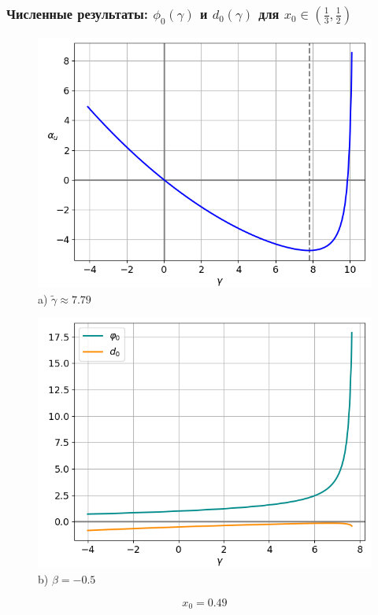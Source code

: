 \documentclass[fullscreen=true, unicode, bookmarks=false]{beamer}
\begin{document}
\begin{frame}
\frametitle{ Численные результаты: $ \phi_0(\gamma) $ и $ d_0(\gamma) $ для $ x_0 \in \left( \frac{1}{3}, \frac{1}{2} \right) $ }

\begin{figure} 
\begin{minipage}[h]{0.49\linewidth}
\begin{center}
\includegraphics[scale=0.38]{x0=0,49.png} \\ {\scriptsize a) $ \widetilde{\gamma} \approx 7.79 $}
\end{center}
\end{minipage} 
\hfill
\begin{minipage}[h]{0.49\linewidth}
\begin{center}
\includegraphics[scale=0.38]{divergent_phi0d0_x0=0,49,beta=-0,5_before.png}  \\ {\scriptsize b) $ \beta = -0.5 $}
\end{center}
\end{minipage} 
\end{figure}

$$ x_0 = 0.49 $$

\end{frame}
\end{document}
